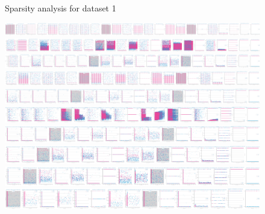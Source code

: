 \documentclass[10pt]{extarticle}
\begin{document}
\begin{figure}[H]
\caption{Sparsity analysis for dataset 1}
\end{figure}

\begin{figure}[H]
\centering\includegraphics[scale=0.10]{images/dataset2/data_profiling/Credit_Score_sparsity_Month_per_class.png}
\includegraphics[scale=0.10]{images/dataset2/data_profiling/Credit_Score_sparsity_Name_per_class.png}
\includegraphics[scale=0.10]{images/dataset2/data_profiling/Credit_Score_sparsity_Age_per_class.png}
\includegraphics[scale=0.10]{images/dataset2/data_profiling/Credit_Score_sparsity_Occupation_per_class.png}
\includegraphics[scale=0.10]{images/dataset2/data_profiling/Credit_Score_sparsity_Annual_Income_per_class.png}
\includegraphics[scale=0.10]{images/dataset2/data_profiling/Credit_Score_sparsity_Monthly_Inhand_Salary_per_class.png}
\includegraphics[scale=0.10]{images/dataset2/data_profiling/Credit_Score_sparsity_Num_Bank_Accounts_per_class.png}
\includegraphics[scale=0.10]{images/dataset2/data_profiling/Credit_Score_sparsity_Num_Credit_Card_per_class.png}
\includegraphics[scale=0.10]{images/dataset2/data_profiling/Credit_Score_sparsity_Interest_Rate_per_class.png}
\includegraphics[scale=0.10]{images/dataset2/data_profiling/Credit_Score_sparsity_NumofLoan_per_class.png}

\end{figure}
\end{document}
